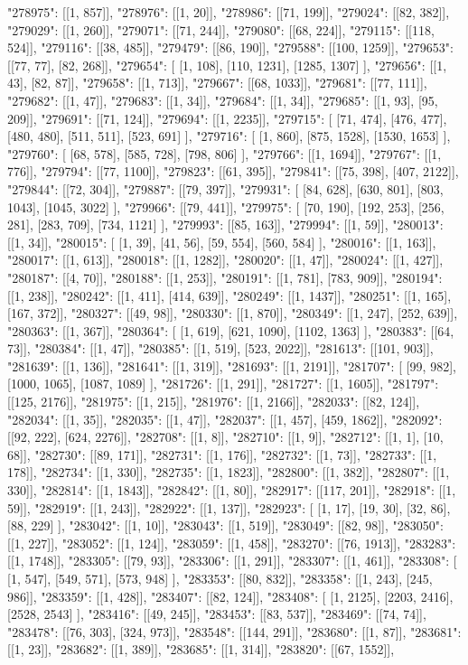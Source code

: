 "278975": [[1, 857]], "278976": [[1, 20]], "278986": [[71, 199]], "279024": [[82, 382]], "279029": [[1, 260]], "279071": [[71, 244]], "279080": [[68, 224]], "279115": [[118, 524]], "279116": [[38, 485]], "279479": [[86, 190]], "279588": [[100, 1259]], "279653": [[77, 77], [82, 268]], "279654": [   [1, 108],   [110, 1231],   [1285, 1307] ], "279656": [[1, 43], [82, 87]], "279658": [[1, 713]], "279667": [[68, 1033]], "279681": [[77, 111]], "279682": [[1, 47]], "279683": [[1, 34]], "279684": [[1, 34]], "279685": [[1, 93], [95, 209]], "279691": [[71, 124]], "279694": [[1, 2235]], "279715": [   [71, 474],   [476, 477],   [480, 480],   [511, 511],   [523, 691] ], "279716": [   [1, 860],   [875, 1528],   [1530, 1653] ], "279760": [   [68, 578],   [585, 728],   [798, 806] ], "279766": [[1, 1694]], "279767": [[1, 776]], "279794": [[77, 1100]], "279823": [[61, 395]], "279841": [[75, 398], [407, 2122]], "279844": [[72, 304]], "279887": [[79, 397]], "279931": [   [84, 628],   [630, 801],   [803, 1043],   [1045, 3022] ], "279966": [[79, 441]], "279975": [   [70, 190],   [192, 253],   [256, 281],   [283, 709],   [734, 1121] ], "279993": [[85, 163]], "279994": [[1, 59]], "280013": [[1, 34]], "280015": [   [1, 39],   [41, 56],   [59, 554],   [560, 584] ], "280016": [[1, 163]], "280017": [[1, 613]], "280018": [[1, 1282]], "280020": [[1, 47]], "280024": [[1, 427]], "280187": [[4, 70]], "280188": [[1, 253]], "280191": [[1, 781], [783, 909]], "280194": [[1, 238]], "280242": [[1, 411], [414, 639]], "280249": [[1, 1437]], "280251": [[1, 165], [167, 372]], "280327": [[49, 98]], "280330": [[1, 870]], "280349": [[1, 247], [252, 639]], "280363": [[1, 367]], "280364": [   [1, 619],   [621, 1090],   [1102, 1363] ], "280383": [[64, 73]], "280384": [[1, 47]], "280385": [[1, 519], [523, 2022]], "281613": [[101, 903]], "281639": [[1, 136]], "281641": [[1, 319]], "281693": [[1, 2191]], "281707": [   [99, 982],   [1000, 1065],   [1087, 1089] ], "281726": [[1, 291]], "281727": [[1, 1605]], "281797": [[125, 2176]], "281975": [[1, 215]], "281976": [[1, 2166]], "282033": [[82, 124]], "282034": [[1, 35]], "282035": [[1, 47]], "282037": [[1, 457], [459, 1862]], "282092": [[92, 222], [624, 2276]], "282708": [[1, 8]], "282710": [[1, 9]], "282712": [[1, 1], [10, 68]], "282730": [[89, 171]], "282731": [[1, 176]], "282732": [[1, 73]], "282733": [[1, 178]], "282734": [[1, 330]], "282735": [[1, 1823]], "282800": [[1, 382]], "282807": [[1, 330]], "282814": [[1, 1843]], "282842": [[1, 80]], "282917": [[117, 201]], "282918": [[1, 59]], "282919": [[1, 243]], "282922": [[1, 137]], "282923": [   [1, 17],   [19, 30],   [32, 86],   [88, 229] ], "283042": [[1, 10]], "283043": [[1, 519]], "283049": [[82, 98]], "283050": [[1, 227]], "283052": [[1, 124]], "283059": [[1, 458]], "283270": [[76, 1913]], "283283": [[1, 1748]], "283305": [[79, 93]], "283306": [[1, 291]], "283307": [[1, 461]], "283308": [   [1, 547],   [549, 571],   [573, 948] ], "283353": [[80, 832]], "283358": [[1, 243], [245, 986]], "283359": [[1, 428]], "283407": [[82, 124]], "283408": [   [1, 2125],   [2203, 2416],   [2528, 2543] ], "283416": [[49, 245]], "283453": [[83, 537]], "283469": [[74, 74]], "283478": [[76, 303], [324, 973]], "283548": [[144, 291]], "283680": [[1, 87]], "283681": [[1, 23]], "283682": [[1, 389]], "283685": [[1, 314]], "283820": [[67, 1552]], 